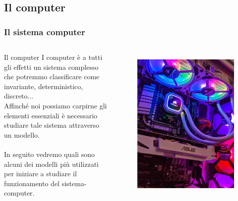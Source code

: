 \subsection[Il computer]{Il computer}
\begin{frame}
	\frametitle{Il sistema computer}
	
	\begin{columns}			
		\begin{block}{Il computer}
			I computer è a tutti gli effetti un sistema complesso che potremmo classificare come invariante, deterministico, discreto...\\
			Affinché noi possiamo carpirne gli elementi essenziali è necessario studiare tale sistema attraverso un modello.\\~\\
			In seguito vedremo quali sono alcuni dei modelli più utilizzati per iniziare a studiare il funzionamento del sistema-computer.			
		\end{block}
		
		\begin{figure}[!htbp]
			\centering 
			\includegraphics[width=0.95\linewidth]{images/1_i_sistemi/computer.jpeg}
			\label{fig:systems_computer}
		\end{figure}		
	\end{columns}
	
	
\end{frame}
